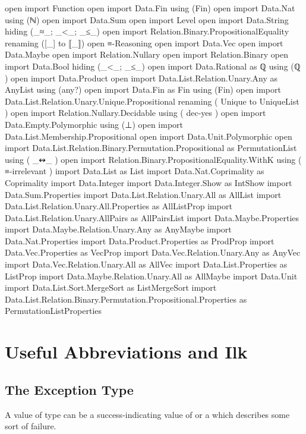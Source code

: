 \documentclass{report}
\begin{document}
\begin{code}
open import Function
open import Data.Fin using (Fin)
open import Data.Nat using (ℕ)
open import Data.Sum
open import Level
open import Data.String hiding (_≈_; _<_; _≤_)
open import Relation.Binary.PropositionalEquality renaming ([_] to ⟦_⟧)
open ≡-Reasoning
open import Data.Vec
open import Data.Maybe
open import Relation.Nullary
open import Relation.Binary
open import Data.Bool hiding (_<_; _≤_)
open import Data.Rational
  as ℚ
  using (ℚ
        )
open import Data.Product
open import Data.List.Relation.Unary.Any as AnyList using (any?)
open import Data.Fin as Fin using (Fin)
open import Data.List.Relation.Unary.Unique.Propositional
  renaming
    ( Unique to UniqueList
    )
open import Relation.Nullary.Decidable
  using
    ( dec-yes
    )
open import Data.Empty.Polymorphic using (⊥)
open import Data.List.Membership.Propositional
open import Data.Unit.Polymorphic
open import Data.List.Relation.Binary.Permutation.Propositional
  as PermutationList
  using
    ( _↭_
    )
open import Relation.Binary.PropositionalEquality.WithK
  using
    ( ≡-irrelevant
    )
import Data.List as List
import Data.Nat.Coprimality as Coprimality
import Data.Integer
import Data.Integer.Show as IntShow
import Data.Sum.Properties
import Data.List.Relation.Unary.All as AllList
import Data.List.Relation.Unary.All.Properties as AllListProp
import Data.List.Relation.Unary.AllPairs as AllPairsList
import Data.Maybe.Properties
import Data.Maybe.Relation.Unary.Any as AnyMaybe
import Data.Nat.Properties
import Data.Product.Properties as ProdProp
import Data.Vec.Properties as VecProp
import Data.Vec.Relation.Unary.Any as AnyVec
import Data.Vec.Relation.Unary.All as AllVec
import Data.List.Properties as ListProp
import Data.Maybe.Relation.Unary.All as AllMaybe
import Data.Unit
import Data.List.Sort.MergeSort as ListMergeSort
import Data.List.Relation.Binary.Permutation.Propositional.Properties
  as PermutationListProperties
\end{code}

\chapter{Useful Abbreviations and Ilk}

\section{The Exception Type}
A value of type   can be a success-indicating value of  or a  which describes some sort of failure.
\end{document}
